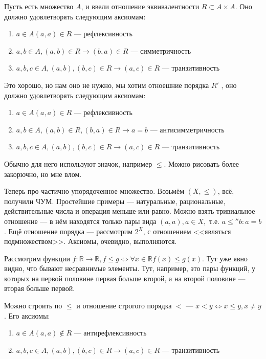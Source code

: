 
Пусть есть множество $A$, и ввели отношение эквивалентности $R \subset A \times A$. Оно должно удовлетворять следующим аксиомам:

\begin{enumerate}
\item{$a \in A (a, a) \in R$} --- рефлексивность
\item{$a, b \in A, (a, b) \in R \to (b, a) \in R$} --- симметричность
\item{$a, b, c \in A, (a, b), (b, c) \in R \to (a, c) \in R$ --- транзитивность}
\end{enumerate}

Это хорошо, но нам оно не нужно, мы хотим отноешние порядка $R'$ , оно должно удовлетворять следующим аксиомам:

\begin{enumerate}
\item{$a \in A (a, a) \in R$} --- рефлексивность
\item{$a, b \in A, (a, b) \in R, (b, a) \in R \to a = b$} --- антисимметричность
\item{$a, b, c \in A, (a, b), (b, c) \in R \to (a, c) \in R$ --- транзитивность}
\end{enumerate}

Обычно для него используют значок, например $\le$. Можно рисовать более закорючно, но мне влом.

Теперь про частично упорядоченное множество. Возьмём  $(X, \le)$, всё, получили ЧУМ. Простейшие примеры --- натуральные, рациональные, действительные числа и операция меньше-или-равно. Можно взять тривиальное отношение --- в нём находятся только пары вида $(a, a), a \in X, $ т.е. $a \le'' b : a = b$. Ещё отношение порядка --- рассмотрим $2^X$, с отношением <<являться подмножеством>>. Аксиомы, очевидно, выполняются. 

Рассмотрим функции $f : \mathbb{R} \to \mathbb{R}, f \le g \Leftrightarrow \forall x \in \mathbb{R} f(x) \le g(x)$. Тут уже явно видно, что бывают несравнимые элементы. Тут, например, это пары функций, у которых на первой половине первая больше второй, а на второй половине --- вторая больше первой.

Можно строить по $\le$ и отношение строгого порядка $<$ --- $x < y \Leftrightarrow x \le y, x \neq y$. Его аксиомы:


\begin{enumerate}
\item{$a \in A (a, a) \not\in R$} --- антирефлексивность
\item{$a, b, c \in A, (a, b), (b, c) \in R \to (a, c) \in R$ --- транзитивность}
\end{enumerate}

